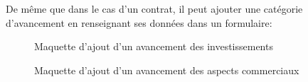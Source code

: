 \documentclass[a4paper]{report}
\begin{document}
\begin{doublespace}
	De même que dans le cas d'un contrat, il peut ajouter une catégorie d'avancement en renseignant ses données dans un formulaire:
	\begin{figure}[H]
		\begin{center}
			\caption{Maquette d'ajout d'un avancement des investissements}
		\end{center}
	\end{figure}

	\begin{figure}[H]
		\begin{center}
			\caption{Maquette d'ajout d'un avancement des aspects commerciaux}
		\end{center}
	\end{figure}


\end{doublespace}
\end{document}
